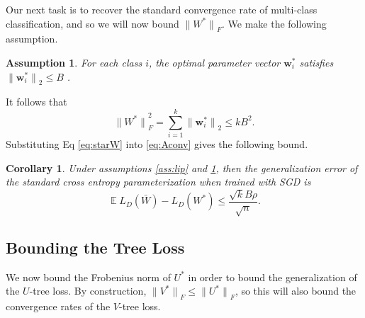 \documentclass[twoside]{article}
\newtheorem{assumption}{Assumption}
\newtheorem{corollary}{Corollary}
\DeclareMathOperator{\E}{\mathbb E}
\renewcommand{\star}[1]{{#1}^{*}}
\newcommand{\w}{\mathbf w}
\newcommand{\ltwo}[1]{{\lVert {#1} \rVert}_2}
\newcommand{\lF}[1]{{\lVert {#1} \rVert}_F}
\newcommand{\ignore}[1]{}
\begin{document}
Our next task is to recover the standard convergence rate of multi-class classification, and so we will now bound $\lF{\star W}$.
We make the following assumption.
\begin{assumption}
    \label{ass:B}
    For each class $i$, the optimal parameter vector $\star\w_i$ satisfies
        $\ltwo{\star\w_i} \le B$
        .
\end{assumption}
%
It follows that
\begin{equation}
    \lF{\star W}^2 = \sum_{i=1}^k \ltwo{\star\w_i} \le kB^2.
    \label{eq:starW}
\end{equation}
Substituting Eq \eqref{eq:starW} into \eqref{eq:Aconv} gives the following bound.
\begin{corollary}
\label{theorem:xentropy}
    Under assumptions \ref{ass:lip} and \ref{ass:B},
    then the generalization error of the standard cross entropy parameterization when trained with SGD is
\begin{equation}
    \E L_D(\bar W) - L_D(W^*)
    \le \frac {\sqrt kB\rho}{\sqrt n}
    .
\end{equation}
\end{corollary}

\ignore{
It is important to note that this result above is an upper bound and not a lower bound.
This $O(\sqrt{k/n})$ convergence rate matches the convergence rate implied by the Nataranj dimension \citep{}.
We are not aware of any lower bounds for SGD in the Lipschitz setting.
\citet{nguyen2018tight,jentzen2020lower} study the strongly convex case and find that the upper bounds match the lower bounds.
}

\subsection{Bounding the Tree Loss}

We now bound the Frobenius norm of $\star U$ in order to bound the generalization of the $U$-tree loss.
By construction, $\lF{\star V} \le \lF{\star U}$,
so this will also bound the convergence rates of the $V$-tree loss.
\end{document}
